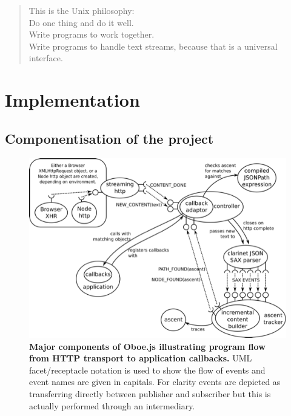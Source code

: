 \documentclass[12pt, ]{article}
\makeatletter
\let\stdsection\section
\renewcommand\section{\newpage\stdsection}
\def\maxwidth{\ifdim\Gin@nat@width>\linewidth\linewidth
\else\Gin@nat@width\fi}
\let\Oldincludegraphics\includegraphics
\renewcommand{\includegraphics}[1]{\Oldincludegraphics[width=\maxwidth]{#1}}
\makeatother
\begin{document}
\begin{quote}
This is the Unix philosophy:\\Do one thing and do it well.\\Write
programs to work together.\\Write programs to handle text streams,
because that is a universal interface.
\end{quote}

\section{Implementation}\label{implementation}

\subsection{Componentisation of the
project}\label{componentisation-of-the-project}

\begin{figure}[htbp]
\centering
\includegraphics{images/overallDesign.png}
\caption{\textbf{Major components of Oboe.js illustrating program flow
from HTTP transport to application callbacks.} UML facet/receptacle
notation is used to show the flow of events and event names are given in
capitals. For clarity events are depicted as transferring directly
between publisher and subscriber but this is actually performed through
an intermediary. \label{overallDesign}}
\end{figure}
\end{document}
